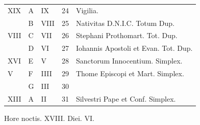 \begin{center}
\begin{tabular}{l | l | l | r | l l}
\color{Red} XIX & \color{Red} A & \color{Red} IX & 24 & \qquad \color{Red} Vigilia. \\
\color{Red}  & B & \color{Red} VIII & 25 & \multicolumn{2}{l}{\color{Red} Nativitas D.N.I.C. Totum Dup.} \color{Red} \\
\color{Red} VIII & C & \color{Red} VII & 26 & Stephani Prothomart. Tot. Dup. & \color{Red} \\
\color{Red}  & D & \color{Red} VI & 27 & \multicolumn{2}{l}{\color{Red} Iohannis Apostoli et Evan. Tot. Dup.} \color{Red} \\
\color{Red} XVI & E & \color{Red} V & 28 & Sanctorum Innocentium. Simplex. & \color{Red} \\
\color{Red} V & F & \color{Red} IIII & 29 & \color{Red} Thome Episcopi et Mart. Simplex. & \color{Red} \\
\color{Red}  & G & \color{Red} III & 30 &  & \color{Red} \\
\color{Red} XIII & \color{Red} A & \color{Red} II & 31 & Silvestri Pape et Conf. Simplex. & \\
\end{tabular}
\newline \color{Red} Hore noctis. XVIII. Diei. VI.
\end{center}